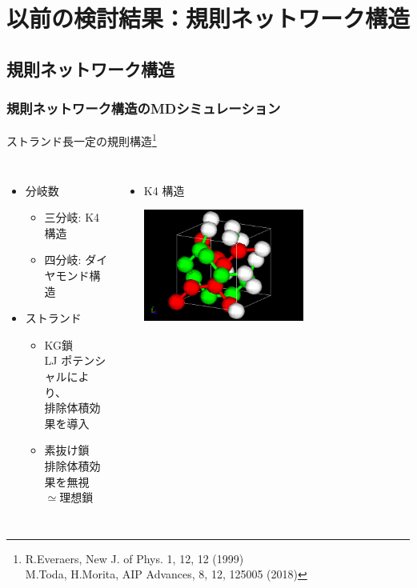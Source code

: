 \documentclass[12pt, dvipdfmx]{beamer}
\begin{document}
\section{以前の検討結果：規則ネットワーク構造}
\subsection{規則ネットワーク構造}
\begin{frame}
	\frametitle{規則ネットワーク構造のMDシミュレーション}
	ストランド長一定の規則構造\footnote{
		R.Everaers, New J. of Phys. 1, 12, 12 (1999)\\
		M.Toda, H.Morita, AIP Advances, 8, 12, 125005 (2018)
			}
	\begin{columns}[totalwidth=1\textwidth]
			\begin{itemize}
				\item 分岐数 
					\begin{itemize}
						\item 三分岐: K4 構造
						\item 四分岐: ダイヤモンド構造
					\end{itemize}
				\item ストランド
					\begin{itemize}
						\item KG鎖\\LJ ポテンシャルにより、\\ \alert{排除体積効果}を導入
						\item 素抜け鎖\\{\color{blue}排除体積効果を無視}\\$\simeq$\alert{理想鎖}
					\end{itemize}
			\end{itemize}
			\small
			\begin{itemize}
				\item K4 構造

				\includegraphics[width=0.6\textwidth]{K4_d.png}


\end{itemize}
\end{columns}
\end{frame}
\end{document}
